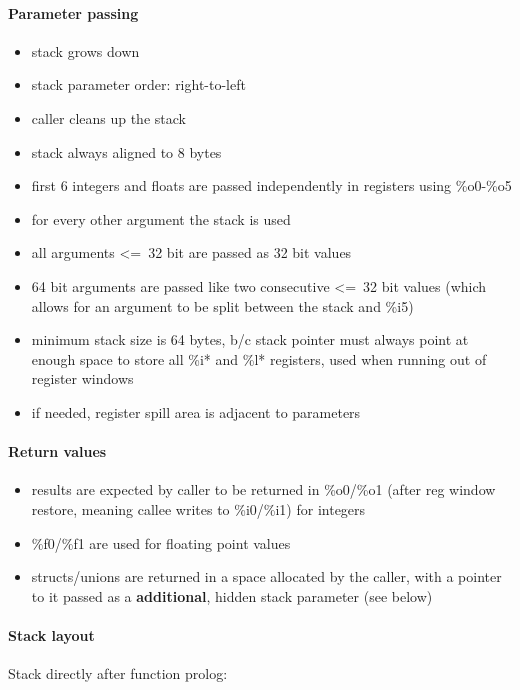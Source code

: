 \paragraph{Parameter passing}
\begin{itemize}
\item stack grows down
\item stack parameter order: right-to-left
\item caller cleans up the stack
\item stack always aligned to 8 bytes
\item first 6 integers and floats are passed independently in registers using \%o0-\%o5
\item for every other argument the stack is used
\item all arguments \textless=\ 32 bit are passed as 32 bit values
\item 64 bit arguments are passed like two consecutive \textless=\ 32 bit values (which allows for an argument to be split between the stack and \%i5)
\item minimum stack size is 64 bytes, b/c stack pointer must always point at enough space to store all \%i* and \%l* registers, used when running out of register windows
\item if needed, register spill area is adjacent to parameters
\end{itemize}

\paragraph{Return values}

\begin{itemize}
\item results are expected by caller to be returned in \%o0/\%o1 (after reg window restore, meaning callee writes to \%i0/\%i1) for integers
\item \%f0/\%f1 are used for floating point values
\item structs/unions are returned in a space allocated by the caller, with a pointer to it passed as a {\bf additional}, hidden stack parameter (see below)
\end{itemize}

\paragraph{Stack layout}

Stack directly after function prolog:\\

